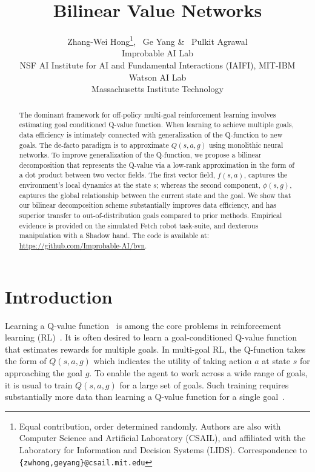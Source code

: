 \documentclass[dvipsnames]{article} %
\title{Bilinear Value Networks}
\author{Zhang-Wei Hong\thanks{\fontsize{8}{8} Equal contribution, order determined randomly. Authors are also with Computer Science and Artificial Laboratory (CSAIL), and affiliated with the Laboratory for Information and Decision Systems (LIDS). Correspondence to \texttt{\{zwhong,geyang\}@csail.mit.edu}}, ~Ge Yang\printfnsymbol{1}\printfnsymbol{2} \& ~Pulkit Agrawal\printfnsymbol{2}\printfnsymbol{3} \\
Improbable AI Lab\\ 
NSF AI Institute for AI and Fundamental Interactions (IAIFI)\printfnsymbol{2}, MIT-IBM Watson AI Lab\printfnsymbol{3} \\
Massachusetts Institute Technology\\
}
\theoremstyle{definition}
\theoremstyle{remark}
\begin{document}
\maketitle

\begin{abstract}

The dominant framework for off-policy multi-goal reinforcement learning involves estimating goal conditioned Q-value function. When learning to achieve multiple goals, data efficiency is intimately connected with generalization of the Q-function to new goals.  The de-facto paradigm is to approximate  \(Q(s, a, g)\) using monolithic neural networks. 
To improve generalization of the Q-function,
we propose a bilinear decomposition that represents the Q-value via a low-rank approximation in the form of a dot product between two vector fields. 
The first vector field, \(f(s, a)\), captures the environment's local dynamics at the state \(s\); whereas the second component, \(\phi(s, g)\), captures the global relationship between the current state and the goal.
We show that our bilinear decomposition scheme substantially improves data efficiency, and has superior transfer to out-of-distribution goals compared to prior methods. Empirical evidence is provided on the simulated Fetch robot task-suite, and dexterous manipulation with a Shadow hand. The code is available at: \url{https://github.com/Improbable-AI/bvn}.
\end{abstract}

\section{Introduction}
\label{sec:intro}

Learning a Q-value function~\citep{watkins1992q} is among the core problems in reinforcement learning (RL)~\citep{Sutton2018introduction}. It is often desired to learn a goal-conditioned Q-value function~\citep{Kaelbling1993goals} that estimates rewards for multiple goals. 
In multi-goal RL, the Q-function takes the form of $Q(s,a,g)$ which indicates the utility of taking action $a$ at state $s$ for approaching the goal $g$. To enable the agent to work across a wide range of goals, it is usual to train 
$Q(s,a,g)$  for a large set of goals. Such training requires substantially more data than learning a Q-value function for a single goal~\citep{Schaul2015UVFA}.
\end{document}
